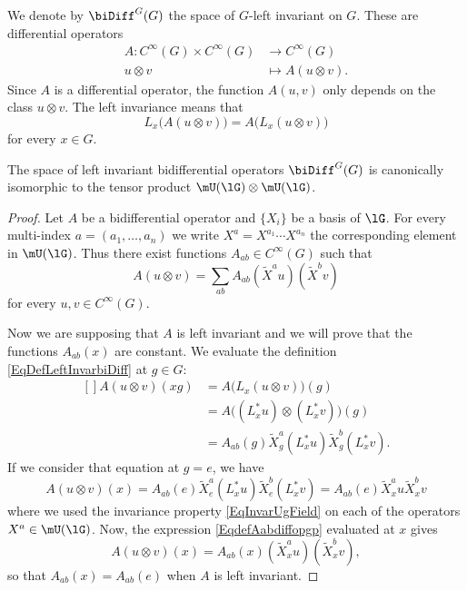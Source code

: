 We denote by $\biDiff^G(G)$ the space of $G$-left invariant  on $G$. These are differential operators
\begin{equation}
	\begin{aligned}
		A\colon  C^{\infty}(G)\times C^{\infty}(G)&\to  C^{\infty}(G) \\
		u\otimes v&\mapsto A(u\otimes v). 
	\end{aligned}
\end{equation}
Since $A$ is a differential operator, the function $A(u,v)$ only depends on the class $u\otimes v$. The left invariance means that
\begin{equation}		\label{EqDefLeftInvarbiDiff}
	L_x\big( A(u\otimes v) \big)=A\big( L_x(u\otimes v) \big)
\end{equation}
for every $x\in G$.

\begin{proposition}		\label{PropbidiffUU}
	The space of left invariant bidifferential operators $\biDiff^G(G)$ is canonically isomorphic to the tensor product $\mU(\lG)\otimes\mU(\lG)$.
\end{proposition}

\begin{proof}
	Let $A$ be a bidifferential operator and $\{ X_i \}$ be a basis of $\lG$. For every multi-index $a=(a_1,\ldots,a_n)$ we write $X^a=X^{a_1}\cdots X^{a_n}$ the corresponding element in $\mU(\lG)$. Thus there exist functions $A_{ab}\in C^{\infty}(G)$ such that
	\begin{equation}	\label{EqdefAabdiffopgp}
		A(u\otimes v)=\sum_{ab}A_{ab}(\tilde X^au)(\tilde X^bv)
	\end{equation}
	for every $u,v\in C^{\infty}(G)$.

	Now we are supposing that $A$ is left invariant and we will prove that the functions $A_{ab}(x)$ are constant. We evaluate the definition \eqref{EqDefLeftInvarbiDiff} at $g\in G$:
	\begin{equation}
		\begin{aligned}[]
			A(u\otimes v)(xg)&=A\big( L_x(u\otimes v) \big)(g)\\
					&=A\big( (L^*_xu)\otimes (L^*_xv) \big)(g)\\
					&=A_{ab}(g)\tilde X^a_g(L^*_xu)\tilde X^b_g(L^*_xv).
		\end{aligned}
	\end{equation}
	If we consider that equation at $g=e$, we have
	\begin{equation}
		A(u\otimes v)(x)=A_{ab}(e)\tilde X^a_e(L^*_xu)\tilde X^b_e(L^*_xv)=A_{ab}(e)\tilde X^a_xu\tilde X^b_xv
	\end{equation}
	where we used the invariance property \eqref{EqInvarUgField} on each of the operators $X^a\in\mU(\lG)$. Now, the expression \eqref{EqdefAabdiffopgp} evaluated at $x$ gives
	\begin{equation}
		A(u\otimes v)(x)=A_{ab}(x)(\tilde X_x^au)(\tilde X_x^bv),
	\end{equation}
	so that $A_{ab}(x)=A_{ab}(e)$ when $A$ is left invariant.
\end{proof}

